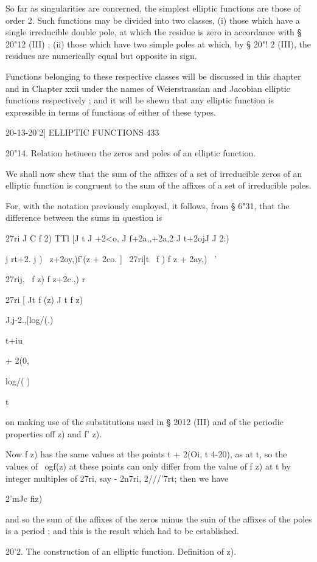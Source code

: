 So far as singularities are concerned, the simplest elliptic functions
are those of order 2. Such functions may be divided into two classes,
(i) those which have a single irreducible double pole, at which the
residue is zero in accordance with § 20"12 (III) ; (ii) those which
have two simple poles at which, by § 20"! 2 (III), the residues are
numerically equal but opposite in sign.

Functions belonging to these respective classes will be discussed in
this chapter and in Chapter xxii under the names of Weierstrassian and
Jacobian elliptic functions respectively ; and it will be shewn that
any elliptic function is expressible in terms of functions of either
of these types.

20-13-20'2] ELLIPTIC FUNCTIONS 433

20"14. Relation hetiueen the zeros and poles of an elliptic function.

We shall now shew that the sum of the affixes of a set of irreducible
zeros of an elliptic function is congruent to the sum of the affixes
of a set of irreducible poles.

For, with the notation previously employed, it follows, from § 6"31,
that the difference between the sums in question is

27ri J C f 2) TTl [J t J +2<o, J f+2a,,+2a,2 J t+2ojJ J 2:)

  j rt+2. j ) \ z+2oy,)f'(z + 2co. ] ~27ri]t \ f ) f z + 2ay,) \ '

27rij, \ f z) f z+2c.,) r

27ri [ Jt f (z) J t f z)

J.j-2.,[log/(.)

t+iu

+ 2(0,

log/( )

t

on making use of the substitutions used in § 2012 (III) and of the
periodic properties off z) and f' z).

Now f z) has the same values at the points t + 2(Oi, t 4-20), as at t,
so the values of \ ogf(z) at these points can only differ from the
value of f z) at t by integer multiples of 27ri, say - 2n7ri,
2///'7rt; then we have

2'mJc fiz)

and so the sum of the affixes of the zeros minus the suin of the
affixes of the poles is a period ; and this is the result which had to
be established.

20'2. The construction of an elliptic function. Definition of z).


